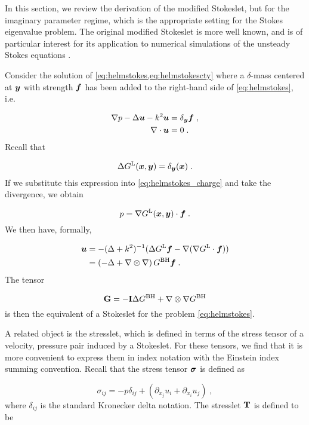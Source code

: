 In this section, we review the derivation of the
modified Stokeslet, but for the imaginary parameter
regime, which is the appropriate setting for the Stokes
eigenvalue problem.
The original modified Stokeslet is more well known,
and is of particular interest for its application to
numerical simulations of the unsteady Stokes equations
\cite{pozrikidis1992boundary,biros2002embedded}.

 Consider the solution of
\cref{eq:helmstokes,eq:helmstokescty} where a $\delta$-mass
centered at ${\boldsymbol y}$ with strength ${\boldsymbol f}$
has been added to the right-hand side of \cref{eq:helmstokes}, i.e.

\begin{align}
  \nabla p - \Delta {\boldsymbol u} - k^2 {\boldsymbol u} &= \delta_{\boldsymbol y} {\boldsymbol f} \; ,
  \label{eq:helmstokes_charge} \\
  \nabla \cdot {\boldsymbol u} &= 0 \; .
\end{align}
Recall that

\begin{equation}
  \Delta G^{\textrm{L}}({\boldsymbol x},{\boldsymbol y}) = \delta_{\boldsymbol y}({\boldsymbol x}) \; .
\end{equation}
If we substitute this expression into
\eqref{eq:helmstokes_charge} and take the divergence,
we obtain

\begin{equation}
  p = \nabla G^{\textrm{L}}({\boldsymbol x},{\boldsymbol y}) \cdot {\boldsymbol f} \; .
\end{equation}
We then have, formally,

\begin{align}
  {\boldsymbol u} &= - (\Delta + k^2)^{-1} ( \Delta G^{\textrm{L}} {\boldsymbol f}
  - \nabla (\nabla G^{\textrm{L}} \cdot {\boldsymbol f} ) ) \\
  &= \left ( -\Delta + \nabla \otimes \nabla \right )
  G^{\textrm{BH}} {\boldsymbol f} \; .
\end{align}
The tensor

\begin{equation}
  {\bf G} = - {\bf I} \Delta G^{\textrm{BH}} + \nabla \otimes \nabla G^{\textrm{BH}}
\end{equation}
is then the equivalent of a Stokeslet
\cite{pozrikidis1992boundary} for the problem
\eqref{eq:helmstokes}.

A related object is the stresslet, which is defined
in terms of the stress tensor of a velocity, pressure
pair induced by a Stokeslet. For these tensors, we find
that it is more convenient to express them in index notation
with the Einstein index summing convention.
Recall that the stress tensor ${\boldsymbol \sigma}$ is defined as 

\begin{equation}
  \sigma_{ij} = -p \delta_{ij} + \left ( \partial_{x_j}u_i
  +\partial_{x_i} u_j \right ) \; ,
\end{equation}
where $\delta_{ij}$ is the standard Kronecker delta notation.
The stresslet ${\bf T}$ is defined to be

